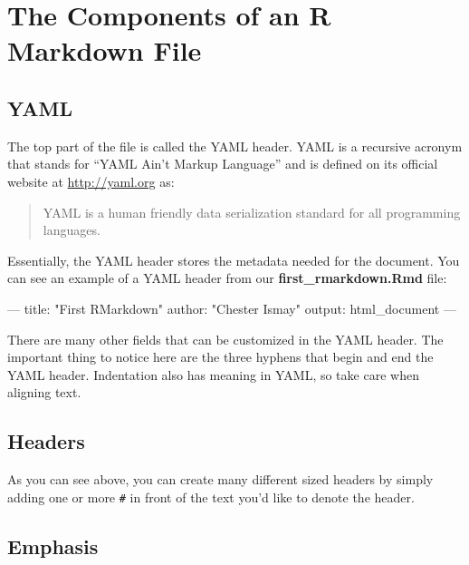 \documentclass[]{tufte-book}
\newenvironment{Shaded}{\begin{snugshade}}{\end{snugshade}}
\newcommand{\AttributeTok}[1]{\textcolor[rgb]{0.77,0.63,0.00}{#1}}
\newcommand{\FunctionTok}[1]{\textcolor[rgb]{0.00,0.00,0.00}{#1}}
\newcommand{\OtherTok}[1]{\textcolor[rgb]{0.56,0.35,0.01}{#1}}
\newcommand{\StringTok}[1]{\textcolor[rgb]{0.31,0.60,0.02}{#1}}
\begin{document}
\hypertarget{the-components-of-an-r-markdown-file}{%
\section{The Components of an R Markdown File}\label{the-components-of-an-r-markdown-file}}

\hypertarget{yaml}{%
\subsection{YAML}\label{yaml}}

The top part of the file is called the YAML header. YAML is a recursive acronym that stands for ``YAML Ain't Markup Language'' and is defined on its official website at \url{http://yaml.org} as:

\begin{quote}
YAML is a human friendly data serialization
standard for all programming languages.
\end{quote}

Essentially, the YAML header stores the metadata needed for the document. You can see an example of a YAML header from our \textbf{first\_rmarkdown.Rmd} file:

\begin{Shaded}
\begin{Highlighting}[]
\OtherTok{---}
\FunctionTok{title:}\AttributeTok{ }\StringTok{"First RMarkdown"}
\FunctionTok{author:}\AttributeTok{ }\StringTok{"Chester Ismay"}
\FunctionTok{output:}\AttributeTok{ html_document}
\OtherTok{---}
\end{Highlighting}
\end{Shaded}

There are many other fields that can be customized in the YAML header. The important thing to notice here are the three hyphens that begin and end the YAML header. Indentation also has meaning in YAML, so take care when aligning text.

\hypertarget{headers}{%
\subsection{Headers}\label{headers}}

As you can see above, you can create many different sized headers by simply adding one or more \texttt{\#} in front of the text you'd like to denote the header.

\hypertarget{emphasis}{%
\subsection{Emphasis}\label{emphasis}}
\end{document}
